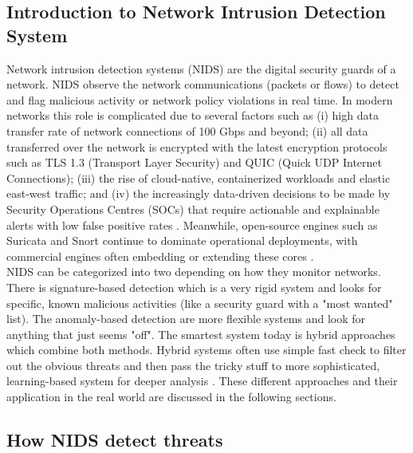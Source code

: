 \subsection{Introduction to Network Intrusion Detection System}
Network intrusion detection systems (NIDS) are the digital security guards of a network. NIDS observe the network communications (packets or flows) to detect and flag malicious activity or network policy violations in real time. In modern networks this role is complicated due to several factors such as (i) high data transfer rate of network connections of 100 Gbps and beyond; (ii) all data transferred over the network is encrypted with the latest encryption protocols such as TLS 1.3 (Transport Layer Security) and QUIC (Quick UDP Internet Connections); (iii) the rise of cloud-native, containerized workloads and elastic east-west traffic; and (iv) the increasingly data-driven decisions to be made by Security Operations Centres (SOCs) that require actionable and explainable alerts with low false positive rates \parencite{Zhou2024TLS13Survey,Cerasuolo2025Adaptable,KBS2025Datasets}.
 Meanwhile, open-source engines such as Suricata and Snort continue to dominate operational deployments, with commercial engines often embedding or extending these cores \parencite{SuricataDocs2025,SnortManual2024,CiscoSnort3Guide2024}.\\

\noindent NIDS can be categorized into two depending on how they monitor networks. There is signature-based detection which is a very rigid system and looks for specific, known malicious activities (like a security guard with a "most wanted" list). The anomaly-based detection are more flexible systems and look for anything that just seems "off". The smartest system today is hybrid approaches which combine both methods. Hybrid systems often use simple fast check to filter out the obvious threats and then pass the tricky stuff to more sophisticated, learning-based system for deeper analysis \parencite{Maseno2022HybridReview,Han2023HPNIDS,Naghib2025HybridReview}. These different approaches and their application in the real world are discussed in the following sections.

\subsection{How NIDS detect threats}
